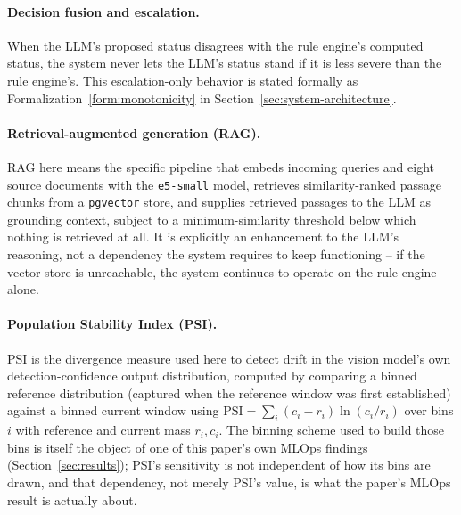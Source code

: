 \paragraph{Decision fusion and escalation.} When the LLM's proposed status disagrees with the rule
engine's computed status, the system never lets the LLM's status stand if it is less severe than
the rule engine's. This escalation-only behavior is stated formally as
Formalization~\ref{form:monotonicity} in Section~\ref{sec:system-architecture}.

\paragraph{Retrieval-augmented generation (RAG).} RAG here means the specific pipeline that embeds
incoming queries and eight source documents with the \texttt{e5-small} model, retrieves
similarity-ranked passage chunks from a \texttt{pgvector} store, and supplies retrieved passages to
the LLM as grounding context, subject to a minimum-similarity threshold below which nothing is
retrieved at all. It is explicitly an enhancement to the LLM's reasoning, not a dependency the
system requires to keep functioning -- if the vector store is unreachable, the system continues to
operate on the rule engine alone.

\paragraph{Population Stability Index (PSI).} PSI is the divergence measure used here to detect
drift in the vision model's own detection-confidence output distribution, computed by
comparing a binned reference distribution (captured when the reference window was first
established) against a binned current
window using $\mathrm{PSI} = \sum_i (c_i - r_i)\ln(c_i / r_i)$ over bins $i$ with reference and
current mass $r_i, c_i$. The binning scheme used to build those bins is itself the object of one of
this paper's own MLOps findings (Section~\ref{sec:results}); PSI's sensitivity is not independent
of how its bins are drawn, and that dependency, not merely PSI's value, is what the paper's MLOps
result is actually about.
